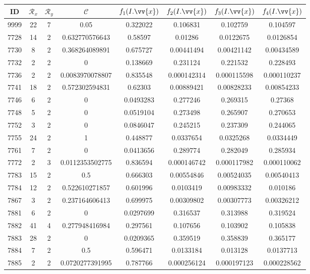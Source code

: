 \scriptsize
\begin{longtable}{|c|c|c|c|c|c|c|c|}
\hline
ID & $\mathscr{R}_x$ & $\mathscr{R}_y$ & $\mathscr{C}$ & $f_1(I.\vv{x})$ & $f_2(I.\vv{x})$ & $f_3(I.\vv{x})$ & $f_4(I.\vv{x})$ \\
\hline
9999 & 22 & 7 & 0.05 & 0.322022 & 0.106831 & 0.102759 & 0.104597 \\
7728 & 14 & 2 & 0.632770576643 & 0.58597 & 0.01286 & 0.0122675 & 0.0126854 \\
7730 & 8 & 2 & 0.368264089891 & 0.675727 & 0.00441494 & 0.00421142 & 0.00434589 \\
7732 & 2 & 2 & 0 & 0.138669 & 0.231124 & 0.221532 & 0.228493 \\
7736 & 2 & 2 & 0.0083970078807 & 0.835548 & 0.000142314 & 0.000115598 & 0.000110237 \\
7741 & 18 & 2 & 0.572302594831 & 0.62303 & 0.00889421 & 0.00828233 & 0.00854233 \\
7746 & 6 & 2 & 0 & 0.0493283 & 0.277246 & 0.269315 & 0.27368 \\
7748 & 5 & 2 & 0 & 0.0519104 & 0.273498 & 0.265907 & 0.270653 \\
7752 & 3 & 2 & 0 & 0.0846047 & 0.245215 & 0.237309 & 0.244065 \\
7755 & 24 & 2 & 1 & 0.448877 & 0.0337654 & 0.0325268 & 0.0334449 \\
7761 & 7 & 2 & 0 & 0.0413656 & 0.289774 & 0.282049 & 0.285934 \\
7772 & 2 & 3 & 0.0112353502775 & 0.836594 & 0.000146742 & 0.000117982 & 0.000110062 \\
7783 & 15 & 2 & 0.5 & 0.666303 & 0.00554846 & 0.00524035 & 0.00540413 \\
7784 & 12 & 2 & 0.522610271857 & 0.601996 & 0.0103419 & 0.00983332 & 0.010186 \\
7867 & 3 & 2 & 0.237164606413 & 0.699975 & 0.00309802 & 0.00307773 & 0.00326212 \\
7881 & 6 & 2 & 0 & 0.0297699 & 0.316537 & 0.313988 & 0.319524 \\
7882 & 41 & 4 & 0.277948416984 & 0.297561 & 0.107656 & 0.103902 & 0.105838 \\
7883 & 28 & 2 & 0 & 0.0209365 & 0.359519 & 0.358839 & 0.365177 \\
7884 & 7 & 2 & 0.5 & 0.596471 & 0.0133184 & 0.013128 & 0.0137713 \\
7885 & 2 & 2 & 0.0720277391995 & 0.787766 & 0.000256124 & 0.000197123 & 0.000228562 \\

\end{longtable}
